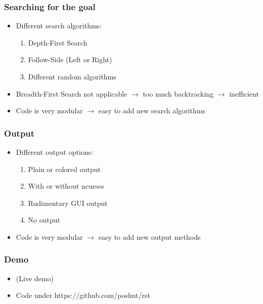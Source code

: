 \documentclass{beamer}
\begin{document}
\begin{frame}
    \frametitle{Searching for the goal}
    \begin{itemize}
        \item Different search algorithms:
            \begin{enumerate}
                \item Depth-First Search
                \item Follow-Side (Left or Right)
                \item Different random algorithms
            \end{enumerate}
        \item Breadth-First Search not applicable $\rightarrow$ too much backtracking $\rightarrow$ inefficient
        \item Code is very modular $\rightarrow$ easy to add new search algorithms
    \end{itemize}
\end{frame}

\begin{frame}
    \frametitle{Output}
    \begin{itemize}
        \item Different output options:
            \begin{enumerate}
                \item Plain or colored output
                \item With or without ncurses
                \item Rudimentary GUI output
                \item No output
            \end{enumerate}
        \item Code is very modular $\rightarrow$ easy to add new output methods
    \end{itemize}
\end{frame}
\begin{frame}
    \frametitle{Demo}
    \begin{itemize}
        \item (Live demo)
        \item Code under https://github.com/poshut/rst
    \end{itemize}
\end{frame}
\end{document}
